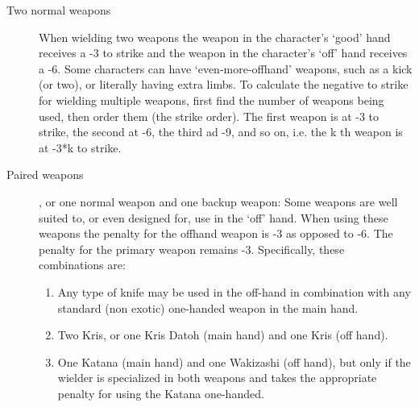 \documentclass[twoside]{book}
\begin{document}
\begin{description}
    
  \item[ Two normal weapons ] 
    {  
     When wielding two weapons the weapon in the
                  character's `good' hand receives a -3
                  to strike and the weapon in the character's
                  `off' hand receives a -6. Some characters
                  can have `even-more-offhand' weapons, such
                  as a kick (or two), or literally having extra limbs. To
                  calculate the negative to strike for wielding multiple
                  weapons, first find the number of weapons being used,
                  then order them (the strike order). The first weapon is
                  at -3 to strike, the second at -6, the third ad -9, and
                  so on, i.e. the k
                   th   weapon is at -3*k to strike. 
                
    }
  
  \item[ Paired weapons ] 
    {  
    , or one normal weapon and one backup weapon:
                  Some weapons are well suited to, or even designed for,
                  use in the `off' hand. When using these
                  weapons the penalty for the offhand weapon is -3 as
                  opposed to -6. The penalty for the primary weapon
                  remains -3. Specifically, these combinations are:
                  
\begin{enumerate}
      
  \item 
                        
    {  
    Any type of knife may be used in the
                         off-hand in combination with any standard (non
                         exotic) one-handed weapon in the main hand.
                         
    }
  
                    
  \item 
                      
    {  
    Two Kris, or one Kris Datoh (main hand) and
                       one Kris (off hand). 
    }
  
                    
  \item 
                      
    {  
    One Katana (main hand) and one Wakizashi
                       (off hand), but only if the wielder is specialized
                       in both weapons and takes the appropriate penalty
                       for using the Katana one-handed. 
    }
  

\end{enumerate}}
\end{description}
\end{document}
